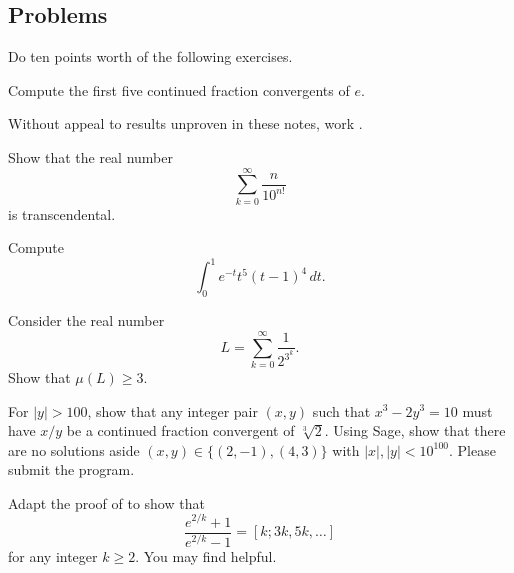 \documentclass[../notes.tex]{subfiles}
\begin{document}
\subsection{Problems}
Do ten points worth of the following exercises.
\begin{prob}[1 points]
	Compute the first five continued fraction convergents of $e$.
\end{prob}
\begin{prob}[2 points]
	Without appeal to results unproven in these notes, work .
\end{prob}
\begin{prob}[3 points]
	Show that the real number
	\[\sum_{k=0}^\infty\frac n{10^{n!}}\]
	is transcendental.
\end{prob}
\begin{prob}[3 points]
	Compute
	\[\int_0^1e^{-t}t^5(t-1)^4\,dt.\]
\end{prob}
\begin{prob}[4 points]
	Consider the real number
	\[L=\sum_{k=0}^\infty\frac1{2^{3^k}}.\]
	Show that $\mu(L)\ge3$.
\end{prob}
\begin{prob}[5 points]
	For $\left|y\right|>100$, show that any integer pair $(x,y)$ such that $x^3-2y^3=10$ must have $x/y$ be a continued fraction convergent of $\sqrt[3]2$. Using Sage, show that there are no solutions aside $(x,y)\in\{(2,-1),(4,3)\}$ with $\left|x\right|,\left|y\right|<10^{100}$. Please submit the program.
\end{prob}
\begin{prob}[10 points]
	Adapt the proof of  to show that
	\[\frac{e^{2/k}+1}{e^{2/k}-1}=[k;3k,5k,\ldots]\]
	for any integer $k\ge2$. You may find \cite{olds-cf-e} helpful.
\end{prob}
\end{document}
